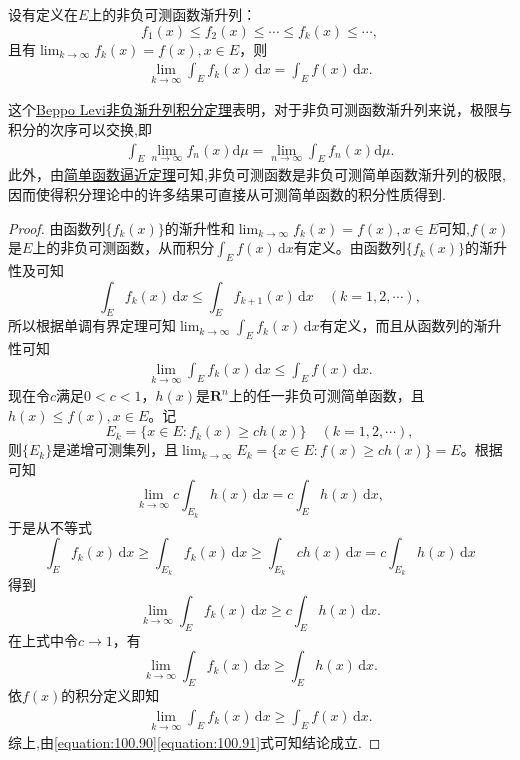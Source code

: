 \documentclass[../../main.tex]{subfiles}
\begin{document}
\begin{theorem}\label{theorem:Beppo Levi非负渐升列积分定理}
设有定义在$E$上的非负可测函数渐升列：
\[
f_1(x) \leqslant f_2(x) \leqslant \cdots \leqslant f_k(x) \leqslant \cdots,
\]
且有$\lim_{k \to \infty} f_k(x) = f(x), x \in E$，则
\begin{align*}
\lim_{k \to \infty} \int_E f_k(x) \, \mathrm{d}x = \int_E f(x) \, \mathrm{d}x. 
\end{align*}
\end{theorem}
\begin{note}
这个\hyperref[theorem:Beppo Levi非负渐升列积分定理]{Beppo Levi非负渐升列积分定理}表明，对于非负可测函数渐升列来说，极限与积分的次序可以交换,即
\begin{align*}
\int_E \lim_{n \to \infty} f_n(x) \mathrm{d}\mu = \lim_{n \to \infty} \int_E f_n(x) \mathrm{d}\mu .
\end{align*}
此外，由\hyperref[theorem:简单函数逼近定理]{简单函数逼近定理}可知,非负可测函数是非负可测简单函数渐升列的极限,因而使得积分理论中的许多结果可直接从可测简单函数的积分性质得到.
\end{note}
\begin{proof}
由函数列$\{f_k(x)\}$的渐升性和$\lim_{k \to \infty} f_k(x) = f(x), x \in E$可知,$f(x)$是$E$上的非负可测函数，从而积分$\int_E f(x) \, \mathrm{d}x$有定义。由函数列$\{f_k(x)\}$的渐升性及可知
\[
\int_E f_k(x) \, \mathrm{d}x \leqslant \int_E f_{k + 1}(x) \, \mathrm{d}x \quad (k = 1,2,\cdots),
\]
所以根据单调有界定理可知$\lim_{k \to \infty} \int_E f_k(x) \, \mathrm{d}x$有定义，而且从函数列的渐升性可知
\begin{align}\label{equation:100.90}
\lim_{k \to \infty} \int_E f_k(x) \, \mathrm{d}x \leqslant \int_E f(x) \, \mathrm{d}x.
\end{align}
现在令$c$满足$0 < c < 1$，$h(x)$是$\mathbf{R}^n$上的任一非负可测简单函数，且$h(x) \leqslant f(x), x \in E$。记
\[
E_k = \{x \in E: f_k(x) \geqslant ch(x)\} \quad (k = 1,2,\cdots),
\]
则$\{E_k\}$是递增可测集列，且$\lim_{k \to \infty} E_k = \{x\in E:f(x)\geqslant ch(x)\}=E$。根据可知
\[
\lim_{k \to \infty} c \int_{E_k} h(x) \, \mathrm{d}x = c \int_E h(x) \, \mathrm{d}x,
\]
于是从不等式
\[
\int_E f_k(x) \, \mathrm{d}x \geqslant \int_{E_k} f_k(x) \, \mathrm{d}x \geqslant \int_{E_k} ch(x) \, \mathrm{d}x = c \int_{E_k} h(x) \, \mathrm{d}x
\]
得到
\[
\lim_{k \to \infty} \int_E f_k(x) \, \mathrm{d}x \geqslant c \int_E h(x) \, \mathrm{d}x.
\]
在上式中令$c \to 1$，有
\[
\lim_{k \to \infty} \int_E f_k(x) \, \mathrm{d}x \geqslant \int_E h(x) \, \mathrm{d}x.
\]
依$f(x)$的积分定义即知
\begin{align}\label{equation:100.91}
\lim_{k \to \infty} \int_E f_k(x) \, \mathrm{d}x \geqslant \int_E f(x) \, \mathrm{d}x.
\end{align}
综上,由\eqref{equation:100.90}\eqref{equation:100.91}式可知结论成立.
\end{proof}
\end{document}
